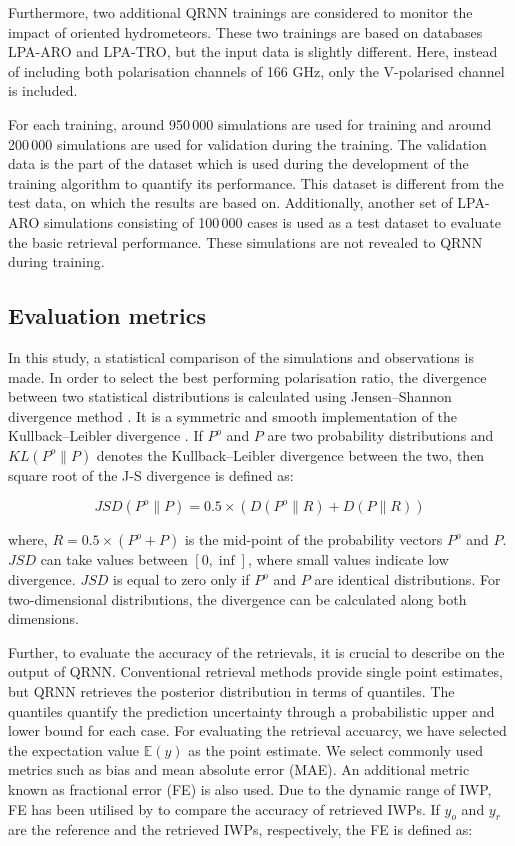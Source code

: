 \documentclass[amt, manuscript]{copernicus}
\begin{document}
Furthermore, two additional QRNN trainings are considered to monitor the impact of oriented hydrometeors. These two trainings are based on databases LPA-ARO and LPA-TRO, but the input data is slightly different. Here, instead of including both polarisation channels of 166\,\,GHz, only the V-polarised channel is included.

For each training, around 950\,000  simulations are used for training and around 200\,000 simulations are used for validation during the training. The validation data is the part of the dataset which is used during the development of the training algorithm to quantify its performance. This dataset is different from the test data, on which the results are based on. Additionally, another set of LPA-ARO simulations consisting of 100\,000 cases is used as a test dataset to evaluate the  basic retrieval performance. These simulations are not revealed to QRNN during training. 

\subsection{Evaluation metrics}
\label{sec:evaluation}

In this study, a statistical comparison of the simulations and observations is made. In order to select the best performing polarisation ratio, the divergence between two statistical distributions is calculated using  Jensen–Shannon divergence method \citep[J-S divergence,][]{lin:91:diver}.  It is a symmetric and smooth implementation of the Kullback–Leibler divergence \citep{Joyce:kl:11}. If $P^o$ and $P$ are two probability distributions and $KL (P^o \parallel P)$ denotes the Kullback–Leibler divergence between the two, then square root of the J-S divergence is defined as:

\begin{equation}
JSD(P^o \parallel P) = 0.5 \times (D(P^o \parallel R)+D(P \parallel R))
\end{equation}

where, $R = 0.5 \times (P^o + P)$ is the mid-point of the probability vectors $P^o$ and $P$. $JSD$ can take values between $[0, \inf]$, where small values indicate low divergence. $JSD$ is equal to zero only if $P^o$ and $P$ are identical distributions. For two-dimensional distributions, the divergence can be calculated along both dimensions.

Further, to evaluate the accuracy of the retrievals, it is crucial to describe on the output of QRNN. Conventional retrieval methods provide single point estimates, but QRNN retrieves the posterior distribution in terms of quantiles. The quantiles quantify the prediction uncertainty through a probabilistic upper and lower bound for each case. For evaluating the retrieval accuarcy, we have selected the expectation value $\mathbb{E}(y)$ as the point estimate. We select commonly used metrics such as bias and mean absolute error (MAE). An additional metric known as fractional error (FE) is also used. Due to the dynamic range of IWP, FE has been utilised by \citet{holl:spare:14, brath:micro:20}  to compare the accuracy of retrieved IWPs. If $y_o$ and $y_r$ are the reference and the retrieved IWPs, respectively, the FE is defined as:
\end{document}
